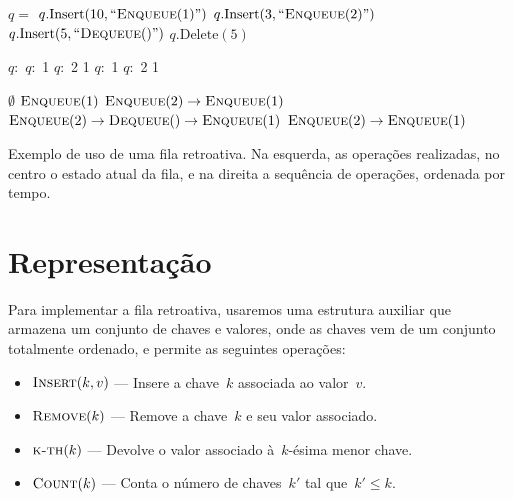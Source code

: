 \documentclass[main.tex]{subfiles}
\begin{document}
\begin{table}
\centering

\begin{subalgorithm}{0.34\textwidth}
\begin{algorithmic}

	\State $q =$ 
	\State $q.\text{Insert}(10, ``\Call{Enqueue}{1}")$
	\State $q.\text{Insert}(3, ``\Call{Enqueue}{2}")$
	\State $q.\text{Insert}(5, ``\Call{Dequeue}{\null}")$
	\State $q.\text{Delete}(5)$

\end{algorithmic}
\end{subalgorithm} \vrule
\begin{subalgorithm}{0.14\textwidth}
\begin{algorithmic}

	\State $q:$
	\State $q:$ 1
	\State $q:$ 2 1
	\State $q:$ 1
	\State $q:$ 2 1

\end{algorithmic}
\end{subalgorithm} \vrule
\begin{subalgorithm}{0.5\textwidth}
\begin{algorithmic}

	\State $\emptyset$
	\State $\Call{Enqueue}{1}$
	\State $\Call{Enqueue}{2} \rightarrow \Call{Enqueue}{1}$
	\State $\Call{Enqueue}{2} \rightarrow \Call{Dequeue}{\null} \rightarrow \Call{Enqueue}{1}$
	\State $\Call{Enqueue}{2} \rightarrow \Call{Enqueue}{1}$

\end{algorithmic}
\end{subalgorithm}
\caption{Exemplo de uso de uma fila retroativa. Na esquerda, as operações realizadas, no centro o estado atual da fila, e na direita a sequência de operações, ordenada por tempo.} \label{ex:fila_retro}
\end{table}

\section{Representação}

Para implementar a fila retroativa, usaremos uma estrutura auxiliar que armazena um conjunto de chaves e valores, onde as chaves vem de um conjunto totalmente ordenado, e permite as seguintes operações:

\begin{itemize}
	\item $\Call{Insert}{k, v}$ --- Insere a chave~$k$ associada ao valor~$v$.
	\item $\Call{Remove}{k}$ --- Remove a chave~$k$ e seu valor associado.
	\item $\Call{k-th}{k}$ --- Devolve o valor associado à~$k$-ésima menor chave. %
	\item $\Call{Count}{k}$ --- Conta o número de chaves~$k'$ tal que~$k' \leq k$.
\end{itemize}
\end{document}
